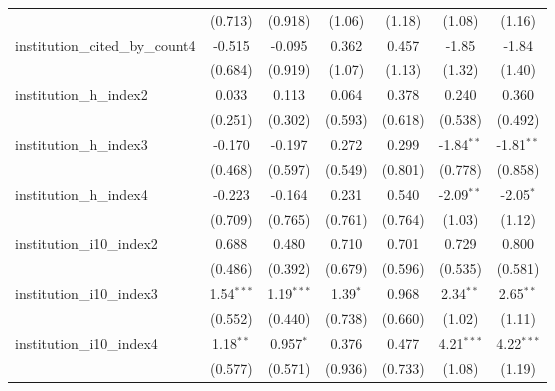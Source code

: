\begin{tabular}{lcccccc}
                                         & (0.713)       & (0.918)       & (1.06)        & (1.18)        & (1.08)        & (1.16)\\   
   institution\_cited\_by\_count4        & -0.515        & -0.095        & 0.362         & 0.457         & -1.85         & -1.84\\   
                                         & (0.684)       & (0.919)       & (1.07)        & (1.13)        & (1.32)        & (1.40)\\   
   institution\_h\_index2                & 0.033         & 0.113         & 0.064         & 0.378         & 0.240         & 0.360\\   
                                         & (0.251)       & (0.302)       & (0.593)       & (0.618)       & (0.538)       & (0.492)\\   
   institution\_h\_index3                & -0.170        & -0.197        & 0.272         & 0.299         & -1.84$^{**}$  & -1.81$^{**}$\\   
                                         & (0.468)       & (0.597)       & (0.549)       & (0.801)       & (0.778)       & (0.858)\\   
   institution\_h\_index4                & -0.223        & -0.164        & 0.231         & 0.540         & -2.09$^{**}$  & -2.05$^{*}$\\   
                                         & (0.709)       & (0.765)       & (0.761)       & (0.764)       & (1.03)        & (1.12)\\   
   institution\_i10\_index2              & 0.688         & 0.480         & 0.710         & 0.701         & 0.729         & 0.800\\   
                                         & (0.486)       & (0.392)       & (0.679)       & (0.596)       & (0.535)       & (0.581)\\   
   institution\_i10\_index3              & 1.54$^{***}$  & 1.19$^{***}$  & 1.39$^{*}$    & 0.968         & 2.34$^{**}$   & 2.65$^{**}$\\   
                                         & (0.552)       & (0.440)       & (0.738)       & (0.660)       & (1.02)        & (1.11)\\   
   institution\_i10\_index4              & 1.18$^{**}$   & 0.957$^{*}$   & 0.376         & 0.477         & 4.21$^{***}$  & 4.22$^{***}$\\   
                                         & (0.577)       & (0.571)       & (0.936)       & (0.733)       & (1.08)        & (1.19)\\   

\end{tabular}
